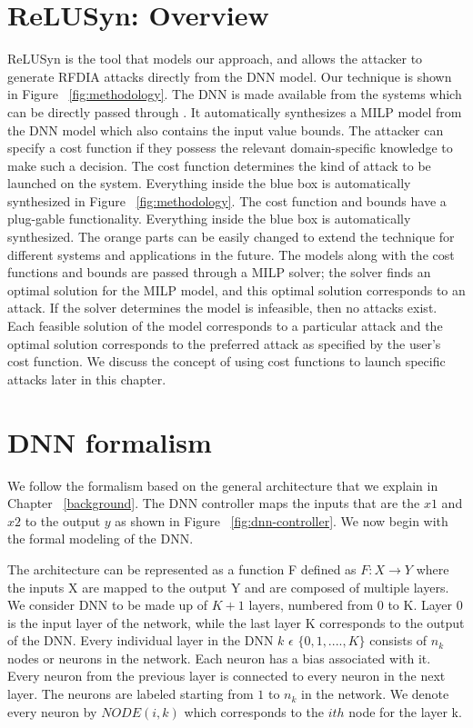 \section{ReLUSyn: Overview}
ReLUSyn is the tool that models our approach, and allows the attacker to generate \ac{RFDIA} attacks directly from the \ac{DNN} model. 
Our technique is shown in Figure ~\ref{fig:methodology}.
The \ac{DNN} is made available from the systems which can be directly passed through \tool. 
It automatically synthesizes a \ac{MILP} model from the \ac{DNN} model which also contains the input value bounds.
The attacker can specify a cost function if they possess the relevant domain-specific knowledge to make such a decision. 
The cost function determines the kind of attack to be launched on the system.
Everything inside the blue box is automatically synthesized in Figure ~\ref{fig:methodology}.
The cost function and bounds have a plug-gable functionality. 
Everything inside the blue box is automatically synthesized.
The orange parts can be easily changed to extend the technique for different systems and applications in the future. 
The models along with the cost functions and bounds are passed through a MILP solver; the solver finds an optimal solution for the MILP model, and this optimal solution corresponds to an attack. If the solver determines the model is infeasible, then no attacks exist.
Each feasible solution of the model corresponds to a particular attack and the optimal solution corresponds to the preferred attack as specified by the user's cost function. We discuss the concept of using cost functions to launch specific attacks later in this chapter.
	
\section{DNN formalism}
We follow the formalism based on the general architecture that we explain in Chapter ~\ref{background}. 
The \ac{DNN} controller maps the inputs that are the $x1$ and $x2$ to the output $y$ as shown in  Figure ~\ref{fig:dnn-controller}.   
We now begin with the formal modeling of the \ac{DNN}.


The architecture can be represented as a function F defined as $F: X \rightarrow Y$ where the inputs X are mapped to the output Y and are composed of multiple layers. 
We consider \ac{DNN} to be made up of $K + 1$ layers, numbered from 0 to K.
Layer 0 %
is the input layer of the network, while
the last layer K corresponds to the output of the \ac{DNN}.
Every individual layer in the \ac{DNN} $k$ $\epsilon$ $\{0,1,....,K\}$ consists of $n_k$ nodes or neurons in the network.
Each neuron has a bias associated with it. 
Every neuron from the previous layer is connected to every neuron in the next layer. 
The neurons are labeled starting from $1$ to $n_k$ in the network. 
We denote every neuron by $NODE(i,k)$ which corresponds to the $ith$ node for the layer k. 

